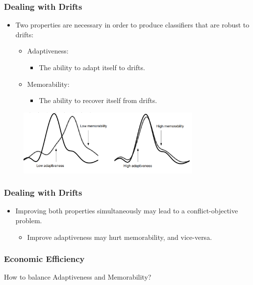 \documentclass[14pt]{beamer}
\begin{document}
\begin{frame}\frametitle{Dealing with Drifts}

\begin{itemize}
\item Two properties are necessary in order to produce classifiers that are robust to drifts:
\begin{itemize}
\item Adaptiveness:
\begin{itemize}
\item The ability to adapt itself to drifts.
\end{itemize}
\item Memorability:
\begin{itemize}
\item The ability to recover itself from drifts.
\end{itemize}
\end{itemize}
\end{itemize}

\begin{figure}
\centering
\includegraphics[height=1.30in]{drift3}
\end{figure}
\end{frame}

\begin{frame}\frametitle{Dealing with Drifts}

\begin{itemize}
\item Improving both properties simultaneously may lead to a conflict-objective problem.
\begin{itemize}
\item Improve adaptiveness may hurt memorability, and vice-versa.
\end{itemize}
\end{itemize}

\end{frame}


\begin{frame}\frametitle{Economic Efficiency}

How to balance Adaptiveness and Memorability?

\centering

\end{frame}
\end{document}
